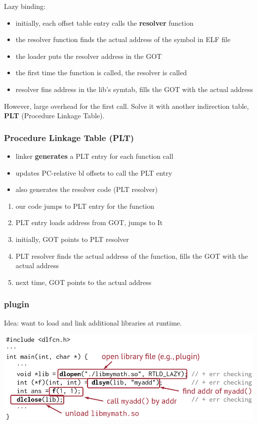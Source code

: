 \documentclass[letterpaper,12pt]{article}
\begin{document}
Lazy binding:\begin{itemize}
    \item initially, each offset table entry calls the \textbf{resolver} function
    \item the resolver function finds the actual address of the symbol in ELF file
    \item the loader puts the resolver address in the GOT
    \item the first time the function is called, the resolver is called
    \item resolver fins address in the lib's symtab, fills the GOT with the actual address
\end{itemize}
However, large overhead for the first call. Solve it with another indirection table, \textbf{PLT} (Procedure Linkage Table).
\subsubsection{Procedure Linkage Table (PLT)}
\begin{itemize}
    \item linker \textbf{generates} a PLT entry for each function call
    \item updates PC-relative bl offsets to call the PLT entry
    \item also generates the resolver code (PLT resolver)
\end{itemize}
\begin{enumerate}
    \item our code jumps to PLT entry for the function
    \item PLT entry loads address from GOT, jumps to It
    \item initially, GOT points to PLT resolver
    \item PLT resolver finds the actual address of the function, fills the GOT with the actual address
    \item next time, GOT points to the actual address
\end{enumerate}
\subsubsection{plugin}
Idea: want to load and link additional libraries at runtime.

\includegraphics*[scale = 0.7]{./Images/Plugins Eaxmple.png}
\end{document}
